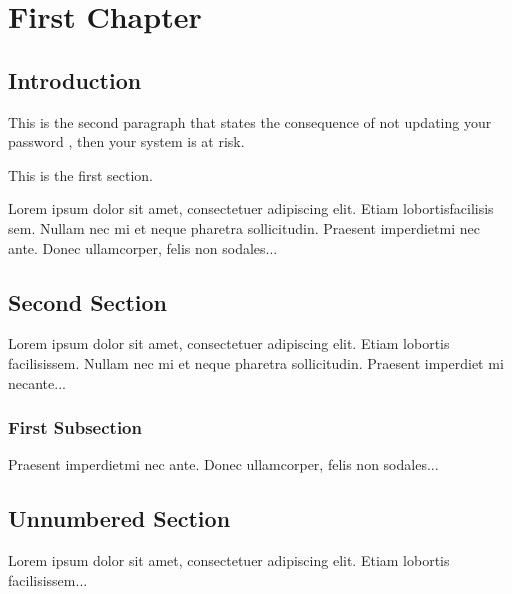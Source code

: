 \documentclass{article}
\begin{document}
\chapter{First Chapter}	
\section{Introduction}
\begin{abstract}
The security environment has a lot of attributes that collapses into one single environment.

\end{abstract}

This is the second paragraph that states the consequence of not updating your password , then your system is at risk.

This is the first section.

Lorem  ipsum  dolor  sit  amet,  consectetuer  adipiscing  
elit. Etiam  lobortisfacilisis sem.  Nullam nec mi et 
neque pharetra sollicitudin.  Praesent imperdietmi nec ante. 
Donec ullamcorper, felis non sodales...

\section{Second Section}

Lorem ipsum dolor sit amet, consectetuer adipiscing elit.  
Etiam lobortis facilisissem.  Nullam nec mi et neque pharetra 
sollicitudin.  Praesent imperdiet mi necante...

\subsection{First Subsection}
Praesent imperdietmi nec ante. Donec ullamcorper, felis non sodales...

\section*{Unnumbered Section}
Lorem ipsum dolor sit amet, consectetuer adipiscing elit.  
Etiam lobortis facilisissem...
\end{document}
